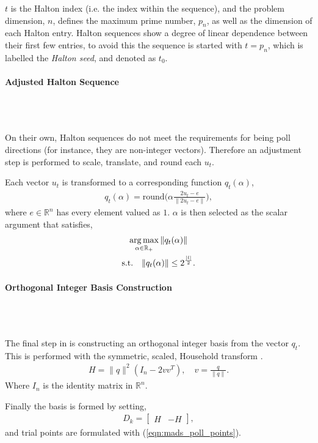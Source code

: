 $t$ is the Halton index (i.e. the index within the sequence), and the problem dimension, $n$, defines the maximum prime number, $p_n$, as well as the dimension of each Halton entry. Halton sequences show a degree of linear dependence between their first few entries, to avoid this the sequence is started with $t=p_n$, which is labelled the \textit{Halton seed}, and denoted as $t_0$.

\paragraph{Adjusted Halton Sequence}\\\

On their own, Halton sequences do not meet the requirements for being poll directions (for instance, they are non-integer vectors). Therefore an adjustment step is performed to scale, translate, and round each $u_t$. 

Each vector $u_t$ is transformed to a corresponding function $q_t(\alpha)$,
\begin{gather}
    q_t(\alpha) = \text{round}\Big(\alpha \frac{2u_t - e}{\|2u_t-e\|}\Big),\label{eqn:halton_adjust}
\end{gather}
where $e\in\mathbb{R}^n$ has every element valued as $1$. $\alpha$ is then selected as the scalar argument that satisfies,
\begin{subequations}
\begin{gather}
    \operatorname*{arg\,max}_{\alpha\in\mathbb{R}_+}\|q_t(\alpha)\|\\
    \text{s.t.} \quad \|q_t(\alpha)\| \leq 2^{\frac{|l|}{2}}.
\end{gather}
\end{subequations}

\paragraph{Orthogonal Integer Basis Construction}\\\

The final step in is constructing an orthogonal integer basis from the vector $q_t$. This is performed with the symmetric, scaled, Household transform \cite{HouseholderUnitaryMatrix}.
\begin{gather}
    H = \|q\|^2(I_n-2vv^T), \quad v = \frac{q}{\|q\|}.\label{eqn:householder}
\end{gather}
Where $I_n$ is the identity matrix in $\mathbb{R}^n$.

Finally the basis is formed by setting,
\begin{gather}
    D_k = \begin{bmatrix} H & -H \end{bmatrix},
\end{gather}
and trial points are formulated with (\ref{eqn:mads_poll_points}).

